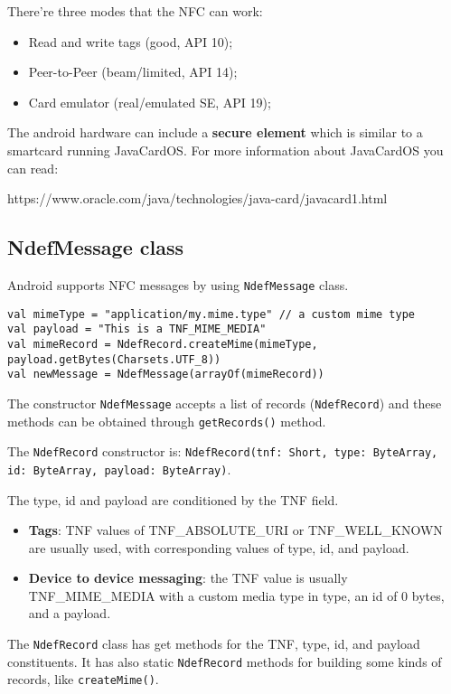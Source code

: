 There're three modes that the NFC can work:

\begin{itemize}
    \item Read and write tags (good, API 10);
    \item Peer-to-Peer (beam/limited, API 14);
    \item Card emulator (real/emulated SE, API 19); 
\end{itemize}


The android hardware can include a \textbf{secure element} which is similar to a smartcard running 
JavaCardOS. For more information about JavaCardOS you can read:

https://www.oracle.com/java/technologies/java-card/javacard1.html

\subsection{NdefMessage class} 
Android supports NFC messages by using \texttt{NdefMessage} class.

\begin{lstlisting}[title=Using NdefMessage class]
val mimeType = "application/my.mime.type" // a custom mime type
val payload = "This is a TNF_MIME_MEDIA"
val mimeRecord = NdefRecord.createMime(mimeType, payload.getBytes(Charsets.UTF_8))
val newMessage = NdefMessage(arrayOf(mimeRecord))
\end{lstlisting}

The constructor \texttt{NdefMessage} accepts a list of records 
(\texttt{NdefRecord}) and these methods can be obtained through 
\texttt{getRecords()} method. 

The \texttt{NdefRecord} constructor is: \texttt{NdefRecord(tnf: Short, 
type: ByteArray, id: ByteArray, payload: ByteArray)}. 

The type, id and payload are conditioned by the TNF field. 

\begin{itemize}
    \item \textbf{Tags}:  TNF values of TNF\_ABSOLUTE\_URI or TNF\_WELL\_KNOWN 
    are usually used, with corresponding values of type, id, and payload. 
    \item \textbf{Device to device messaging}:  the TNF value is usually 
    TNF\_MIME\_MEDIA with a custom media type in type, an id of 0 bytes, 
    and a payload.
\end{itemize}

The \texttt{NdefRecord} class has get methods for the TNF, type, id, and payload constituents.
It has also static \texttt{NdefRecord} methods for building some kinds of records, like
\texttt{createMime()}.

